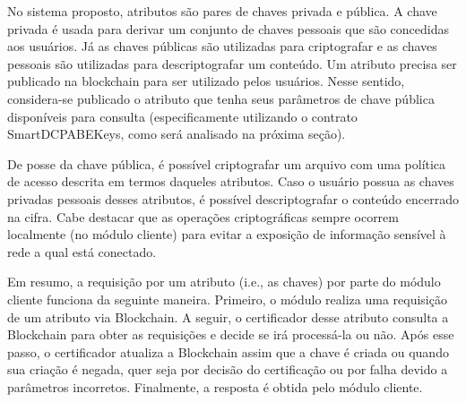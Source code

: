 \documentclass[a4paper,11pt]{article}
\begin{document}
No sistema proposto, atributos são pares de chaves privada e pública.
A chave privada é usada para derivar um conjunto de chaves pessoais que são concedidas aos usuários.
Já as chaves públicas são utilizadas para criptografar e as chaves pessoais são utilizadas para descriptografar um conteúdo.
Um atributo precisa ser publicado na blockchain para ser utilizado pelos usuários.
Nesse sentido, considera-se publicado o atributo que tenha seus parâmetros de chave pública disponíveis para consulta (especificamente utilizando o contrato SmartDCPABEKeys, como será analisado na próxima seção).

De posse da chave pública, é possível criptografar um arquivo com uma política de acesso descrita em termos daqueles atributos. Caso o usuário possua as chaves privadas pessoais desses atributos, é possível descriptografar o conteúdo encerrado na cifra.
Cabe destacar que as operações criptográficas sempre ocorrem localmente {\color{blue}(no módulo cliente)} para evitar a exposição de informação sensível à rede a qual está conectado.




{\color{blue}Em resumo, a requisição por um atributo (i.e., as chaves) por parte do módulo cliente funciona da seguinte maneira. Primeiro, o módulo realiza uma requisição de um atributo via Blockchain. A seguir, o certificador desse atributo consulta a Blockchain para obter as requisições e decide se irá processá-la ou não. Após esse passo, o certificador atualiza a Blockchain assim que a chave é criada ou quando sua criação é negada, quer seja por decisão do certificação ou por falha devido a parâmetros incorretos. Finalmente, a resposta é obtida pelo módulo cliente.}
\end{document}

